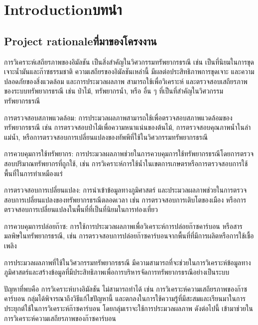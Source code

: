 \chapter{\ifenglish Introduction\else บทนำ\fi}

\section{\ifenglish Project rationale\else ที่มาของโครงงาน\fi}

\hspace{0.5 cm}การวิเคราะห์เสถียรภาพของอิมัลชัน เป็นสิ่งสำคัญในวิศวกรรมทรัพยากรธรณี เช่น เป็นที่นิยมในการขุดเจาะน้ำมันและก๊าซธรรมชาติ ความเสถียรของอิมัลชันเหล่านี้ มีผลต่อประสิทธิภาพการขุดเจาะ และความปลอดภัยของสิ่งแวดล้อม และการประมวลผลภาพ สามารถใช้เพื่อวิเคราะห์ และตรวจสอบเสถียรภาพของระบบทรัพยากรธรณี เช่น ป่าไม้, ทรัพยากรน้ำ, หรือ อื่น ๆ ที่เป็นที่สำคัญในวิศวกรรมทรัพยากรธรณี

การตรวจสอบสภาพแวดล้อม: การประมวลผลภาพสามารถใช้เพื่อตรวจสอบสภาพแวดล้อมของ \newline
ทรัพยากรธรณี เช่น การตรวจสอบป่าไม้เพื่อความหนาแน่นของต้นไม้, การตรวจสอบคุณภาพน้ำในลำแม่น้ำ, หรือการตรวจสอบการเปลี่ยนแปลงของทัพพีที่ใช้ในวิศวกรรมทรัพยากรธรณี

การควบคุมการใช้ทรัพยากร: การประมวลผลภาพช่วยในการควบคุมการใช้ทรัพยากรธรณีโดยการตรวจสอบปริมาณทรัพยากรที่ถูกใช้, เช่น การวิเคราะห์การใช้น้ำในเขตการเกษตรหรือการตรวจสอบการใช้พื้นที่ในการทำเหมืองแร่

การตรวจสอบการเปลี่ยนแปลง: การนำเข้าข้อมูลทางภูมิศาสตร์ และประมวลผลภาพช่วยในการตรวจสอบการเปลี่ยนแปลงของทรัพยากรธรณีตลอดเวลา เช่น การตรวจสอบการเติบโตของเมือง หรือการตรวจสอบการเปลี่ยนแปลงในพื้นที่ที่เป็นที่นิยมในการท่องเที่ยว

การควบคุมการปล่อยก๊าซ: การใช้การประมวลผลภาพเพื่อวิเคราะห์การปล่อยก๊าซคาร์บอน หรือสาร \newline
มลพิษในทรัพยากรธรณี, เช่น การตรวจสอบการปล่อยก๊าซคาร์บอนจากพื้นที่ที่มีการผลิตหรือการใช้เชื้อเพลิง

การประมวลผลภาพที่ใช้ในวิศวกรรมทรัพยากรธรณี มีความสามารถที่จะช่วยในการวิเคราะห์ข้อมูลทางภูมิศาสตร์และสร้างข้อมูลที่มีประสิทธิภาพเพื่อการบริหารจัดการทรัพยากรธรณีอย่างเป็นระบบ

ปัญหาที่พบคือ การวิเคราะห์บางอิมัลชัน ไม่สามารถทำได้ เช่น การวิเคราะห์ความเสถียรภาพของก๊าซคาร์บอน กลุ่มได้พิจารณาถึงวิธีแก้ไขปัญหานี้ และตกลงในการใช้ความรู้ที่มีสะสมและเรียนมาในการประยุกต์ใช้ในการวิเคราะห์ก๊าซคาร์บอน โดยกลุ่มเราจะใช้การประมวลผลภาพ ดังต่อไปนี้ เข้ามาช่วยในการวิเคราะห์ความเสถียรภาพของก๊าซคาร์บอน

